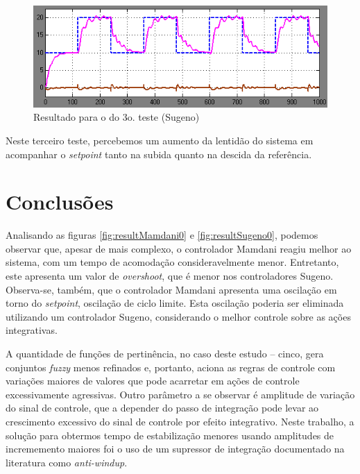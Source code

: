 \documentclass[
	twoside,				%
	twocolumn,				%
	english,				%
	brazil,					%
]{article}
\begin{document}
\begin{figure}[!h]
    \centering
    \includegraphics[width=\columnwidth]{sugeno3.png}
    \caption { Resultado para o do 3o. teste (Sugeno)}
\end{figure}

Neste terceiro teste, percebemos um aumento da lentidão do sistema em acompanhar o \textit{setpoint} tanto na subida quanto na descida da referência.


\section{Conclusões}\label{conclusoes}

Analisando as figuras \ref{fig:resultMamdani0} e \ref{fig:resultSugeno0}, podemos observar que,  apesar de mais complexo, o controlador Mamdani reagiu melhor ao sistema, com um tempo de acomodação consideravelmente menor. Entretanto, este apresenta um valor de \textit{overshoot}, que é menor nos controladores Sugeno. Observa-se, também, que o controlador Mamdani apresenta uma oscilação em torno do \textit{setpoint}, oscilação de ciclo limite. Esta oscilação poderia ser eliminada utilizando um controlador Sugeno, considerando o melhor controle sobre as ações integrativas.

A quantidade de funções de pertinência, no caso deste estudo -- cinco, gera conjuntos \textit{fuzzy} menos refinados e, portanto, aciona as regras de controle com variações maiores de valores que pode acarretar em ações de controle excessivamente agressivas. Outro parâmetro a se observar é amplitude de variação do sinal de controle, que a depender do passo de integração pode levar ao crescimento excessivo do sinal de controle por efeito integrativo. Neste trabalho, a solução para obtermos tempo de estabilização menores usando amplitudes de incrememento maiores foi o uso de um supressor de integração documentado na literatura como \textit{anti-windup}.
\end{document}
